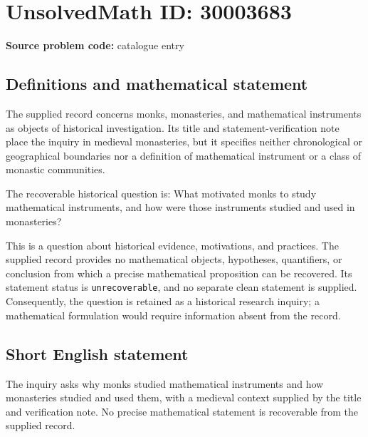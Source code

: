 \documentclass[11pt]{article}
\begin{document}
\section*{UnsolvedMath ID: 30003683}
\textbf{Source problem code:} catalogue entry
\subsection{Definitions and mathematical statement}
The supplied record concerns monks, monasteries, and mathematical instruments as objects of historical investigation. Its title and statement-verification note place the inquiry in medieval monasteries, but it specifies neither chronological or geographical boundaries nor a definition of mathematical instrument or a class of monastic communities.

The recoverable historical question is: What motivated monks to study mathematical instruments, and how were those instruments studied and used in monasteries?

This is a question about historical evidence, motivations, and practices. The supplied record provides no mathematical objects, hypotheses, quantifiers, or conclusion from which a precise mathematical proposition can be recovered. Its statement status is \texttt{unrecoverable}, and no separate clean statement is supplied. Consequently, the question is retained as a historical research inquiry; a mathematical formulation would require information absent from the record.
\subsection{Short English statement}
The inquiry asks why monks studied mathematical instruments and how monasteries studied and used them, with a medieval context supplied by the title and verification note. No precise mathematical statement is recoverable from the supplied record.
\end{document}
